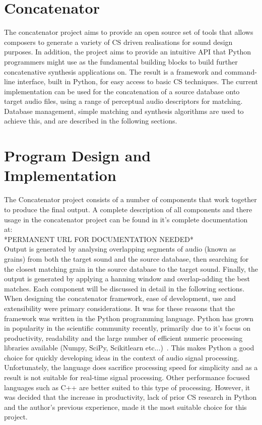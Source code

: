 \documentclass[titlepage]{scrartcl}
\begin{document}
    \section*{Concatenator}
    The concatenator project aims to provide an open source set of tools that
    allows composers to generate a variety of CS driven realisations for
    sound design purposes.  In addition, the project aims to provide an
    intuitive API that Python programmers might use as the fundamental building
    blocks to build further concatenative synthesis applications on.  
    The result is a framework and command-line interface, built in Python, for
    easy access to basic CS techniques.   
    The current implementation can be used for the concatenation of a source
    database onto target audio files, using a range of perceptual audio
    descriptors for matching. Database management, simple matching and
    synthesis algorithms are used to achieve this, and are described in the
    following sections.

    \section*{Program Design and Implementation}
    The Concatenator project consists of a number of components that work
    together to produce the final output. A complete description of all
    components and there usage in the concatenator project can be found in it's
    complete documentation at:\\

    *PERMANENT URL FOR DOCUMENTATION NEEDED*\\

    Output is generated by analysing overlapping segments of audio (known as
    grains) from both the target sound and the source database, then searching
    for the closest matching grain in the source database to the target sound.
    Finally, the output is generated by applying a hanning window and
    overlap-adding the best matches. Each component will be discussed in detail
    in the following sections.\\

    When designing the concatenator framework, ease of development, use and
    extensibility were primary considerations. It was for these reasons that
    the framework was written in the Python programming language. Python has
    grown in popularity in the scientific community recently, primarily due to
    it's focus on productivity, readability and the large number of efficient
    numeric processing libraries available (Numpy, SciPy, Scikitlearn
    etc...)~\parencite[p.11]{Fangohr2014}. This makes Python a good choice for
    quickly developing ideas in the context of audio signal processing.
    Unfortunately, the language does sacrifice processing speed for simplicity
    and as a result is not suitable for real-time signal processing. Other
    performance focused languages such as C++ are better suited to this type of
    processing. However, it was decided that the increase in productivity, lack
    of prior CS research in Python and the author's previous experience,
    made it the most suitable choice for this project.\\
\end{document}
